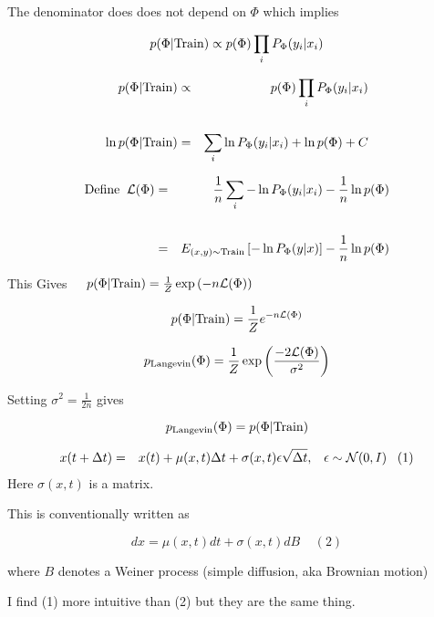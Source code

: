 {\vfill
The denominator does does not depend on $\Phi$ which implies

$$p(\Phi|\mathrm{Train}) \propto p(\Phi)\prod_i P_\Phi(y_i|x_i)$$



{\huge
\begin{eqnarray*}
p(\Phi|\mathrm{Train}) & \propto & p(\Phi)\prod_i P_\Phi(y_i|x_i) \\
\\
\ln p(\Phi|\mathrm{Train}) & = & \sum_i \ln P_\Phi(y_i|x_i) + \ln p(\Phi) + C
\end{eqnarray*}

\vfill
\begin{eqnarray*}
\mathrm{Define}\;\;{\cal L}(\Phi) & = & \frac{1}{n} \sum_i -\ln P_\Phi(y_i|x_i) - \frac{1}{n} \ln p(\Phi) \\
\\
& = & E_{(x,y) \sim \mathrm{Train}}\left[ -\ln P_\Phi(y|x)\right] - \frac{1}{n} \ln p(\Phi)
\end{eqnarray*}

\vfill
\centerline{This Gives{\color{red} $~\;\;\;p(\Phi|\mathrm{Train}) = \frac{1}{Z}\exp\left(-n{\cal L}(\Phi)\right)$}}
}







$$p(\Phi|\mathrm{Train}) = \frac{1}{Z}e^{-n{\cal L}(\Phi)}$$

\vfill
$$p_{\mathrm{Langevin}}(\Phi) = \frac{1}{Z}\exp\left(\frac{-2{\cal L}(\Phi)}{\sigma^2}\right)$$

\vfill
Setting $\sigma^2 = \frac{1}{2n}$ gives

\vfill
$$p_{\mathrm{Langevin}}(\Phi) = p(\Phi|\mathrm{Train})$$


{\huge
\begin{eqnarray*}
x(t + \Delta t) &  =  & x(t) + \mu(x,t)\Delta t + \sigma(x,t)\epsilon \sqrt{\Delta t},\;\;\;\epsilon \sim {\cal N}(0,I)\;\;\;(1)
 \end{eqnarray*}
}
\vfill
Here $\sigma(x,t)$ is a matrix.

\vfill
This is conventionally written as

$$dx = \mu(x,t)dt + \sigma(x,t)dB\;\;\;\;(2)$$

\vfill
where $B$ denotes a Weiner process (simple diffusion, aka Brownian motion)

\vfill
I find (1) more intuitive than (2) but they are the same thing.

}
